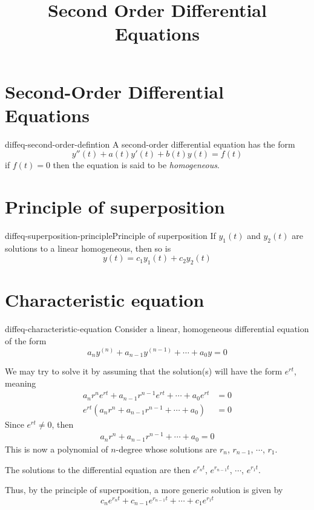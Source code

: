 \documentclass[preview]{standalone}
\begin{document}
\title{Second Order Differential Equations}
\genpage

\section{Second-Order Differential Equations}

\begin{snippet}{diffeq-second-order-defintion}
A second-order differential equation has the form
\[
    y''(t)+a(t)y'(t)+b(t)y(t)=f(t)
\]
if \(f(t)=0\) then the equation is said to be \textit{homogeneous}.
\end{snippet}

\section{Principle of superposition}

\begin{snippettheorem}{diffeq-superposition-principle}{Principle of superposition}
    If \(y_1(t)\) and \(y_2(t)\) are solutions to a linear homogeneous,
    then so is
    \[
        y(t) = c_1 y_1(t) + c_2 y_2(t)
    \]
\end{snippettheorem}

\section{Characteristic equation}

\begin{snippet}{diffeq-characteristic-equation}
Consider a linear, homogeneous differential equation of the form
\[
    a_n y^{(n)} + a_{n-1} y^{(n-1)} + \cdots + a_0y = 0
\]

We may try to solve it by assuming that the solution(s) will have the form \(e^{rt}\),
meaning
\begin{align*}
    a_n r^n e^{rt}
    + a_{n-1} r^{n-1} e^{rt} + \cdots + a_0 e^{rt} & = 0 \\
    e^{rt} \left(
        a_n r^n + a_{n-1} r^{n-1} + \cdots + a_0
    \right) &= 0
\end{align*}
Since \(e^{rt} \neq 0\), then
\begin{align*}
    a_n r^n + a_{n-1} r^{n-1} + \cdots + a_0 = 0
\end{align*}
This is now a polynomial of \(n\)-degree whose solutions are
\(r_n\), \(r_{n-1}\), \(\cdots\), \(r_1\).

The solutions to the differential equation are then \(e^{r_n t}\),
\(e^{r_{n-1}t}\), \(\cdots\), \(e^{r_1 t}\).

Thus, by the principle of superposition, a more generic solution is given by
\[
    c_n e^{r_n t} +
    c_{n-1} e^{r_{n-1}t} +
    \cdots +
    c_1 e^{r_1 t}
\]
\end{snippet}

\end{document}

